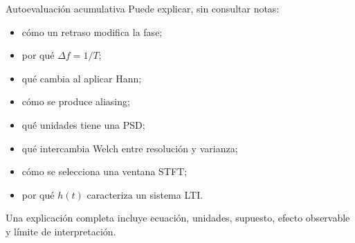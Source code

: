 \documentclass[
  ignorenonframetext,
  aspectratio=169,
  spanish,
]{beamer}
\providecommand{\tightlist}{%
  \setlength{\itemsep}{0pt}\setlength{\parskip}{0pt}}
\begin{document}
\begin{frame}{Autoevaluación acumulativa}
  \protect{}\label{autoevaluaciuxf3n-acumulativa}
  Puede explicar, sin consultar notas:

  \begin{itemize}
    \tightlist
    \item
          cómo un retraso modifica la fase;
    \item
          por qué \(\Delta f=1/T\);
    \item
          qué cambia al aplicar Hann;
    \item
          cómo se produce aliasing;
    \item
          qué unidades tiene una PSD;
    \item
          qué intercambia Welch entre resolución y varianza;
    \item
          cómo se selecciona una ventana STFT;
    \item
          por qué \(h(t)\) caracteriza un sistema LTI.
  \end{itemize}

  \begin{tcolorbox}[enhanced jigsaw, arc=.35mm, bottomrule=.15mm, bottomtitle=1mm, breakable, colback=white, colbacktitle=quarto-callout-note-color!10!white, colframe=quarto-callout-note-color-frame, coltitle=black, left=2mm, leftrule=.75mm, opacityback=0, opacitybacktitle=0.6, rightrule=.15mm, title=\textcolor{quarto-callout-note-color}{\faInfo}\hspace{0.5em}{Nota}, titlerule=0mm, toprule=.15mm, toptitle=1mm]

    Una explicación completa incluye ecuación, unidades, supuesto, efecto
    observable y límite de interpretación.

  \end{tcolorbox}
\end{frame}
\end{document}
